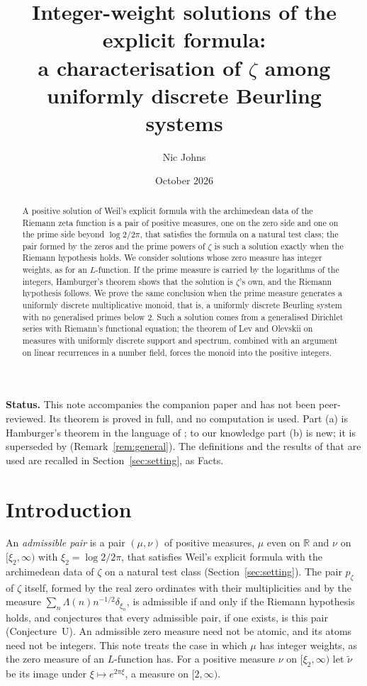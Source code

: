 \documentclass[11pt]{amsart}
\title[Integer-weight solutions of the explicit formula]{Integer-weight solutions of the explicit formula:\\
a characterisation of $\zeta$ among uniformly discrete Beurling systems}
\author{Nic Johns}
\date{October 2026}
\newcommand{\RR}{\mathbb R}
\newcommand{\xin}[1]{\xi_{#1}}
\newcommand{\pz}{p_\zeta}
\theoremstyle{definition}
\theoremstyle{remark}
\numberwithin{equation}{section}
\begin{document}
\begin{abstract}
A positive solution of Weil's explicit formula with the archimedean data of the Riemann zeta function is a pair of
positive measures, one on the zero side and one on the prime side beyond $\log2/2\pi$, that satisfies the formula on a
natural test class; the pair formed by the zeros and the prime powers of $\zeta$ is such a solution exactly when the
Riemann hypothesis holds. We consider solutions whose zero measure has integer weights, as for an $L$-function. If the
prime measure is carried by the logarithms of the integers, Hamburger's theorem shows that the solution is $\zeta$'s
own, and the Riemann hypothesis follows. We prove the same conclusion when the prime measure generates a uniformly
discrete multiplicative monoid, that is, a uniformly discrete Beurling system with no generalised primes below $2$.
Such a solution comes from a generalised Dirichlet series with Riemann's functional equation; the theorem of Lev and
Olevskii on measures with uniformly discrete support and spectrum, combined with an argument on linear recurrences in
a number field, forces the monoid into the positive integers.
\end{abstract}

\maketitle

\noindent\textbf{Status.} This note accompanies the companion paper \cite{PaperI} and has not been peer-reviewed. Its
theorem is proved in full, and no computation is used. Part (a) is Hamburger's theorem in the language of \cite{PaperI};
to our knowledge part (b) is new; it is superseded by \cite[Theorem~3.11]{PaperI} (Remark~\ref{rem:general}). The definitions and the results of \cite{PaperI} that are used are recalled in
Section~\ref{sec:setting}, as Facts.

\section{Introduction}\label{sec:intro}

An \emph{admissible pair} \cite{PaperI} is a pair $(\mu,\nu)$ of positive measures, $\mu$ even on $\RR$ and $\nu$ on
$[\xin2,\infty)$ with $\xin2=\log2/2\pi$, that satisfies Weil's explicit formula with the archimedean data of $\zeta$ on a
natural test class (Section~\ref{sec:setting}). The pair $\pz$ of $\zeta$ itself, formed by the real zero ordinates with
their multiplicities and by the measure $\sum_n\Lambda(n)n^{-1/2}\delta_{\xin n}$, is admissible if and only if the Riemann
hypothesis holds, and \cite{PaperI} conjectures that every admissible pair, if one exists, is this pair (Conjecture~U). An admissible zero
measure need not be atomic, and its atoms need not be integers. This note treats the case in which $\mu$ has integer
weights, as the zero measure of an $L$-function has. For a positive measure $\nu$ on $[\xin2,\infty)$ let $\tilde\nu$ be its
image under $\xi\mapsto e^{2\pi\xi}$, a measure on $[2,\infty)$.
\end{document}
